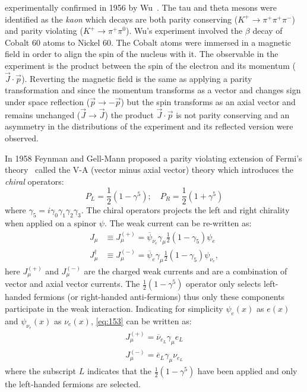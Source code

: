 experimentally confirmed in 1956 by Wu~\cite{WuExperiment}. The tau and theta
mesons were identified as the \emph{kaon} which decays are both parity
conserving ($K^+ \rightarrow \pi^+ \pi^+ \pi^-$) and parity violating
($K^+ \rightarrow \pi^+ \pi^0$). Wu's experiment involved the $\beta$ decay of
Cobalt 60 atoms to Nickel 60. The Cobalt atoms were immersed in a magnetic field
in order to align the spin of the nucleus with it. The observable in the
experiment is the product between the spin of the electron and its momentum
($\vec{J} \cdot \vec{p}$). Reverting the magnetic field is the same as applying
a parity transformation and since the momentum transforms as a vector and
changes sign under space reflection ($\vec{p} \to - \vec{p}$) but the spin
transforms as an axial vector and remains unchanged ($\vec{J} \to \vec{J}$) the
product $\vec{J} \cdot \vec{p}$ is not parity conserving and an asymmetry in the
distributions of the experiment and its reflected version were observed.

In 1958 Feynman and Gell-Mann proposed a parity violating extension of Fermi's
theory~\cite{VATheory} called the V-A (vector minus axial vector) theory which
introduces the \emph{chiral} operators:
\begin{equation}
  \label{eq:152}
  P_L = \frac{1}{2}(1 - \gamma^5); \quad P_R = \frac{1}{2}(1 + \gamma^5)
\end{equation}
where $\gamma_5 = i \gamma_0 \gamma_1 \gamma_2 \gamma_3$. The chiral operators
projects the left and right chirality when applied on a spinor $\psi$. The weak
current can be re-written as:
\begin{equation}
  \begin{split}
    J_\mu & \equiv J_\mu^{(+)} = \overbar{\psi}_{\nu_e} \gamma_\mu \frac{1}{2}
    \left(1 - \gamma_5 \right) \psi_e \\
    J_\mu^\dagger & \equiv J_\mu^{(-)} = \overbar{\psi}_e \gamma_\mu \frac{1}{2}
    (1 - \gamma_5) \psi_{\nu_e},
  \end{split}
  \label{eq:153}
\end{equation}
here $J_\mu^{(+)}$ and $J_\mu^{(-)}$ are the charged weak currents and are a
combination of vector and axial vector currents. The $\frac{1}{2}(1 - \gamma^5)$
operator only selects left-handed fermions (or right-handed anti-fermions) thus
only these components participate in the weak interaction. Indicating for
simplicity $\psi_e (x)$ as $e (x)$ and $\psi_{\nu_e} (x)$ as $\nu_e (x)$,
\cref{eq:153} can be written as:
\begin{equation}
  \begin{aligned}
    J_\mu^{(+)} = \overbar{\nu}_{e_L} \gamma_\mu e_L \\
    J_\mu^{(-)} = \overbar{e}_L \gamma_\mu \nu_{e_L}
  \end{aligned}
  \label{eq:177}
\end{equation}
where the subscript $L$ indicates that the $\frac{1}{2}(1 - \gamma^5)$ have been
applied and only the left-handed fermions are selected.

